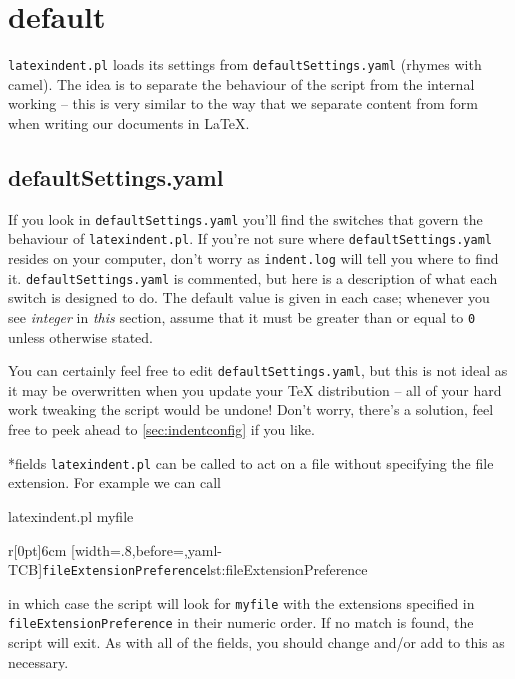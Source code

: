 \section{default}\label{sec:defuseloc}
 \texttt{latexindent.pl} loads its settings from \texttt{defaultSettings.yaml}
 (rhymes with camel). The idea is to separate the behaviour of the script
 from the internal working -- this is very similar to the way that we separate content
 from form when writing our documents in \LaTeX.

\subsection{defaultSettings.yaml}
	If you look in \texttt{defaultSettings.yaml} you'll find the switches
	that govern the behaviour of \texttt{latexindent.pl}. If you're not sure where
	\texttt{defaultSettings.yaml} resides on your computer, don't worry as \texttt{indent.log}
	will tell you where to find it.
	\texttt{defaultSettings.yaml} is commented,
	but here is a description of what each switch is designed to do. The default
	value is given in each case; whenever you see \emph{integer} in \emph{this}
	section, assume that it must be greater than or equal to \texttt{0} unless
	otherwise stated.

	You can certainly feel free to edit \texttt{defaultSettings.yaml}, but
	this is not ideal as it may be overwritten when you update your \TeX{} distribution --
	all of your hard work tweaking the script would be undone! Don't worry,
	there's a solution, feel free to peek ahead to \cref{sec:indentconfig} if you like.

*{fields}
	\texttt{latexindent.pl} can be called to
	act on a file without
	specifying the file extension.  For example we can call
	\begin{commandshell}
latexindent.pl myfile
\end{commandshell}
	\begin{wrapfigure}[8]{r}[0pt]{6cm}
		[width=.8\linewidth,before=\centering,yaml-TCB]{\texttt{fileExtensionPreference}}{lst:fileExtensionPreference}
	\end{wrapfigure}

	in which case the script will look for \texttt{myfile} with the extensions
	specified in \texttt{fileExtensionPreference} in their numeric order. If
	no match is found, the script will exit. As with all of the fields, you should
	change and/or add to this as necessary.

